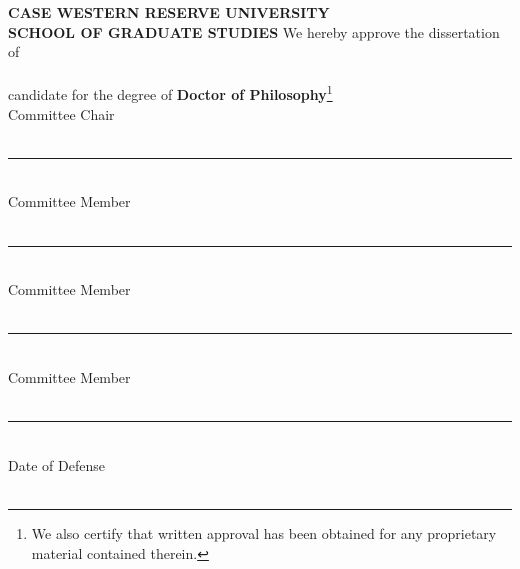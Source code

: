 
\begingroup
\renewcommand*{\thefootnote}{\fnsymbol{footnote}}
\renewcommand*\footnoterule{}
\begin{titlepage}
\begin{onehalfspace}
	\hypersetup{pageanchor=false}
	\null\vfil
	\begin{center}
		{\bfseries \large CASE WESTERN RESERVE UNIVERSITY\\
		SCHOOL OF GRADUATE STUDIES}
		\vfill
		We hereby approve the dissertation of\\
		{\bfseries \theauthor}\\[5pt]
		candidate for the degree of {\bfseries Doctor of Philosophy}\footnote{\normalsize We also certify that written approval has been obtained for any proprietary material contained therein.}\\
		\vfill\vfill
		Committee Chair\\
		{\bfseries \theadvisor}\\
		$\,$\\
		\rule{3 in}{1pt}\\
		Committee Member\\
		{\bfseries \thesecondcmemeber}\\
		$\,$\\
		\rule{3 in}{1pt}\\
		Committee Member\\
		{\bfseries \thethirdcmemeber}\\
		$\,$\\
		\rule{3 in}{1pt}\\
		Committee Member\\
		{\bfseries \theexternalcmember}\\
		$\,$\\
		\rule{3 in}{1pt}\\
		\vfill\vfill
		Date of Defense\\
		{\bfseries \thedefensedate}\\
		\vspace{1cm}
	\end{center}
	\vfil\null
\end{onehalfspace}
\end{titlepage}
\endgroup
